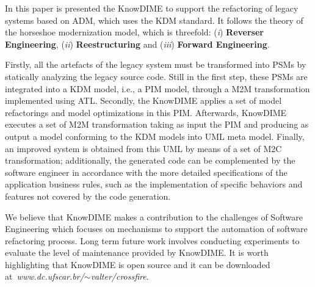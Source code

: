 In this paper is presented the KnowDIME to support the refactoring of legacy systems based on ADM, which uses the KDM standard. It follows the theory of the horseshoe modernization model, which is threefold: (\textit{i}) \textbf{Reverser Engineering}, (\textit{ii}) \textbf{Reestructuring} and  (\textit{iii}) \textbf{Forward Engineering}. 

Firstly, all the artefacts of the legacy system must be transformed into PSMs by statically analyzing the legacy source code. Still in the first step, these PSMs are integrated into a KDM model, i.e., a PIM model, through a M2M transformation implemented using ATL. Secondly, the KnowDIME applies a set of model refactorings and model optimizations in this PIM. Afterwards, KnowDIME executes a set of M2M transformation taking as input the PIM and producing as output a model conforming to the KDM models into UML meta model. Finally, an improved system is obtained from this UML by means of a set of M2C transformation; additionally, the generated code can be complemented by the software engineer in accordance with the more detailed specifications of the application business rules, such as the implementation of specific behaviors and features not covered by the code generation.

We believe that KnowDIME makes a contribution to the challenges of Software Engineering which focuses on mechanisms to support the automation of software refactoring process. Long term future work involves conducting experiments to evaluate the level of maintenance provided by KnowDIME. It is worth highlighting that KnowDIME is open source and it can be downloaded at\textit{~www.dc.ufscar.br/$\sim$valter/crossfire}.

